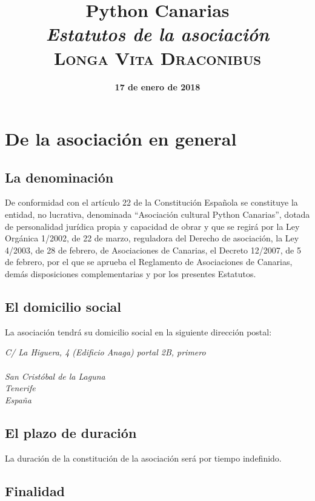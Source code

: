 \documentclass[a4paper, 12pt, oneside]{book}
\title{
    \huge \textbf{Python Canarias} \\
    \textit{Estatutos de la asociación} \\
    \vspace{1cm}
    \large \textsc{Longa Vita Draconibus}
}
\date{\textbf{17 de enero de 2018}}
\begin{document}
\maketitle

\tableofcontents

\chapter{De la asociación en general}

\section{La denominación}

De conformidad con el artículo 22 de la Constitución Española se constituye la entidad, no lucrativa, denominada ``Asociación cultural Python Canarias'', dotada de personalidad jurídica propia y capacidad de obrar y que se regirá por la Ley Orgánica 1/2002, de 22 de marzo, reguladora del Derecho de asociación, la Ley 4/2003, de 28 de febrero, de Asociaciones de Canarias, el Decreto 12/2007, de 5 de febrero, por el que se aprueba el Reglamento de Asociaciones de Canarias, demás disposiciones complementarias y por los presentes Estatutos.

\section{El domicilio social}

La asociación tendrá su domicilio social en la siguiente dirección postal:

{\itshape
\indent C/ La Higuera, 4 (Edificio Anaga) portal 2B, primero\\
\\
\indent San Cristóbal de la Laguna\\
\indent Tenerife\\
\indent España
}

\section{El plazo de duración}

La duración de la constitución de la asociación será por tiempo indefinido.

\section{Finalidad}
\end{document}
